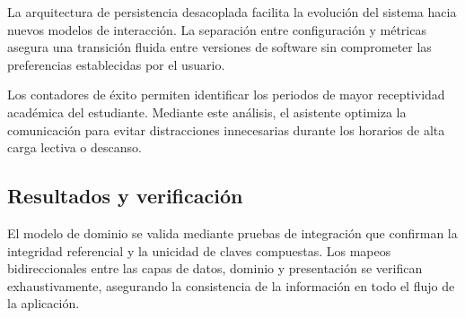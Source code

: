 La arquitectura de persistencia desacoplada facilita la evolución del sistema hacia nuevos modelos de interacción. La separación entre configuración y métricas asegura una transición fluida entre versiones de software sin comprometer las preferencias establecidas por el usuario.

Los contadores de éxito permiten identificar los periodos de mayor receptividad académica del estudiante. Mediante este análisis, el asistente optimiza la comunicación para evitar distracciones innecesarias durante los horarios de alta carga lectiva o descanso.

\subsection{Resultados y verificación}
El modelo de dominio se valida mediante pruebas de integración que confirman la integridad referencial y la unicidad de claves compuestas. Los mapeos bidireccionales entre las capas de datos, dominio y presentación se verifican exhaustivamente, asegurando la consistencia de la información en todo el flujo de la aplicación.
